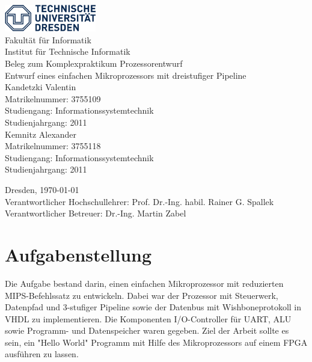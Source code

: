 \documentclass[11pt]{article} %
\begin{document}
\begin{titlepage}
	\begin{center}
		\vspace*{1cm}
		\includegraphics[width=0.3\textwidth]{tud_logo_blau_2133x626}\\
		\vspace{0.5cm}
		{\large Fakultät für Informatik}\\
		{\large Institut für Technische Informatik}\\
		\vspace{3cm}
		{\Large Beleg zum Komplexpraktikum Prozessorentwurf}\\
		\vspace{1cm}
		{\huge Entwurf eines einfachen Mikroprozessors mit dreistufiger Pipeline}\\
		\vspace{1cm}
		{\Large Kandetzki Valentin}\\
		\vspace{0.5cm}
		Matrikelnummer: 3755109\\
		Studiengang: Informationssystemtechnik\\
		Studienjahrgang: 2011\\
		\vspace{1cm}
		{\Large Kemnitz Alexander}\\
		\vspace{0.5cm}
		Matrikelnummer: 3755118\\
		Studiengang: Informationssystemtechnik\\
		Studienjahrgang: 2011\\
		\vfill
		
		\large Dresden, \today\\
		\vspace{2cm}
		\large Verantwortlicher Hochschullehrer: Prof. Dr.-Ing. habil. Rainer G. Spallek\\
		\large Verantwortlicher Betreuer: Dr.-Ing. Martin Zabel\\
		\vspace*{1cm}
\end{center}
\end{titlepage}

\tableofcontents
\newpage


\section{Aufgabenstellung}
Die Aufgabe bestand darin, einen einfachen Mikroprozessor mit reduzierten MIPS-Befehlssatz zu entwickeln.
Dabei war der Prozessor mit Steuerwerk, Datenpfad und 3-stufiger Pipeline sowie der Datenbus mit Wishboneprotokoll in VHDL zu implementieren. Die Komponenten I/O-Controller für UART, ALU sowie Programm- und Datenspeicher waren gegeben.
Ziel der Arbeit sollte es sein, ein "Hello World" Programm mit Hilfe des Mikroprozessors auf einem FPGA ausführen zu lassen.
\end{document}
